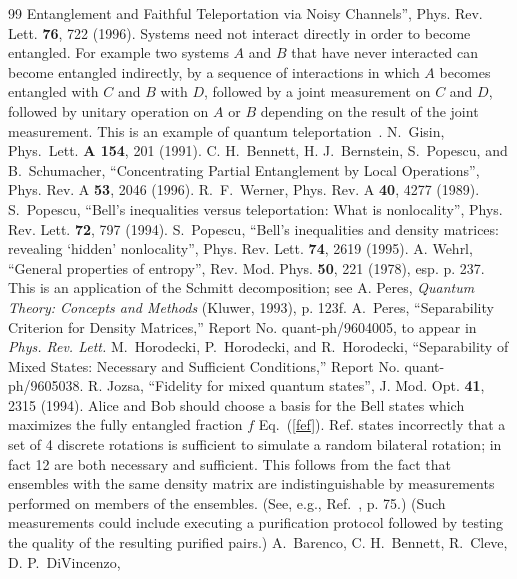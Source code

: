 \begin{thebibliography}{99}
Entanglement and Faithful Teleportation via Noisy Channels'', Phys.
Rev. Lett. {\bf 76}, 722 (1996).
 Systems need not interact directly in order to become
entangled.  For example two systems $A$ and $B$ that have never
interacted can become entangled indirectly, by a sequence of
interactions in which $A$ becomes entangled with $C$ and $B$ with $D$,
followed by a joint measurement on $C$ and $D$, followed by unitary
operation on $A$ or $B$ depending on the result of the joint
measurement.  This is an example of quantum
teleportation~.
 N.~Gisin, Phys.~Lett. {\bf A 154}, 201 (1991).
 C. H.~Bennett, H. J.~Bernstein, S.~Popescu,
and B.~Schumacher, ``Concentrating Partial Entanglement by Local
Operations'', Phys. Rev. A {\bf 53}, 2046 (1996).
 R.~F.~Werner, Phys. Rev. A {\bf 40}, 4277 (1989).
 S.~Popescu, ``Bell's inequalities versus teleportation:
What is nonlocality'', Phys. Rev. Lett. {\bf 72}, 797 (1994).
 S.~Popescu, ``Bell's inequalities and density matrices:
revealing `hidden' nonlocality'', Phys. Rev. Lett. {\bf 74}, 2619 (1995).
 A. Wehrl, ``General properties of entropy'',
Rev. Mod. Phys. {\bf 50}, 221 (1978), esp. p. 237.
 This is an application of the Schmitt decomposition;
see A. Peres, {\it Quantum Theory: Concepts and Methods} (Kluwer, 1993),
p. 123f.
 A.~Peres, ``Separability Criterion for Density
Matrices,'' Report No. quant-ph/9604005, to appear in {\em Phys.
Rev. Lett.}
 M.~Horodecki, P.~Horodecki, and R.~Horodecki,
``Separability of Mixed States: Necessary and Sufficient Conditions,''
Report No. quant-ph/9605038.
 R. Jozsa, ``Fidelity for mixed quantum states'',
J. Mod. Opt. {\bf 41}, 2315 (1994).
 Alice and Bob should choose a basis for
the Bell states which maximizes the fully entangled fraction
$f$ Eq.~(\protect\ref{fef}).
 Ref.  states incorrectly
that a set of 4 discrete rotations is sufficient to simulate a random
bilateral rotation; in fact 12 are both necessary and sufficient.
This follows from
the fact that ensembles with the same density matrix are
indistinguishable by measurements performed on members of the
ensembles.  (See, e.g., Ref.~\protect\cite{Peres}, p. 75.)  (Such measurements
could include executing a purification protocol followed by testing
the quality of the resulting purified pairs.)  
 A.~Barenco, C. H.~Bennett, R.~Cleve, D. P.~DiVincenzo,

\end{thebibliography}
